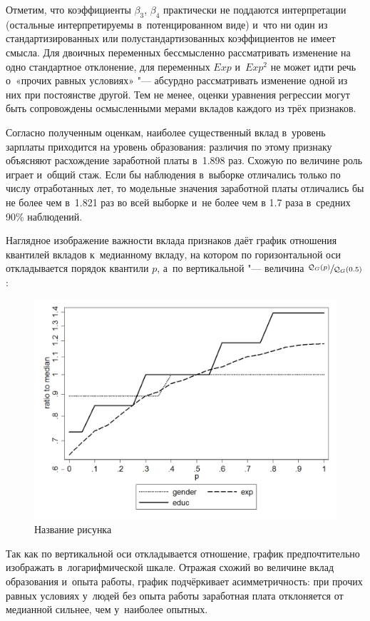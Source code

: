 \documentclass[11pt]{article}
\begin{document}
Отметим, что коэффициенты $\beta_3$, $\beta_4$ практически не поддаются интерпретации (остальные интерпретируемы в~потенцированном виде) и~что ни один из стандартизированных или полустандартизованных коэффициентов не имеет смысла. Для двоичных переменных бессмысленно рассматривать изменение на одно стандартное отклонение, для переменных $Exp$ и~$Exp^2$ не может идти речь о~«прочих равных условиях» "--- абсурдно рассматривать изменение одной из них при постоянстве другой. Тем не менее, оценки уравнения регрессии могут быть сопровождены осмысленными мерами вкладов каждого из трёх признаков.

Согласно полученным оценкам, наиболее существенный вклад в~уровень зарплаты приходится на уровень образования: различия по этому признаку объясняют расхождение заработной платы в~1.898 раз. Схожую по величине роль играет и~общий стаж. Если бы наблюдения в~выборке отличались только по числу отработанных лет, то модельные значения заработной платы отличались бы не более чем в~1.821 раз во всей выборке и~не более чем в 1.7 раза в~средних 90\% наблюдений. 

Наглядное изображение важности вклада признаков даёт график отношения квантилей вкладов к~медианному вкладу, на котором по горизонтальной оси откладывается порядок квантили $p$, а~по вертикальной "--- величина $\sfrac{\mathcal{Q}_G(p)}{\mathcal{Q}_G(0.5)}$:

\begin{figure}[htbp]
	\centering
	\includegraphics[width=12cm]{wageeq.png}
	\caption{Название рисунка}\label{fig:wageeq}
\end{figure} 

Так как по вертикальной оси откладывается отношение, график предпочтительно изображать в~логарифмической шкале. Отражая схожий во величине вклад образования и~опыта работы, график подчёркивает асимметричность: при прочих равных условиях у~людей без опыта работы заработная плата отклоняется от медианной сильнее, чем у~наиболее опытных.
\end{document}
